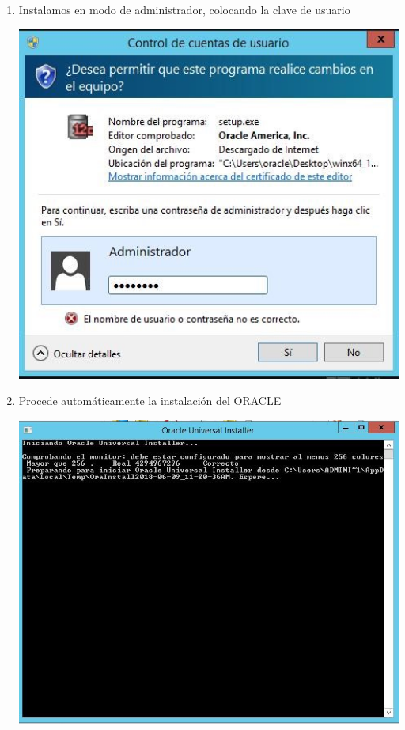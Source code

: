 \begin{enumerate}[1.]
	\item Instalamos en modo de administrador, colocando la clave de usuario\\
	\begin{center}
	\includegraphics[width=15cm]{./Imagenes/img10} 
	\end{center}

	\item Procede autom\'aticamente la instalaci\'on del ORACLE\\
	\begin{center}
	\includegraphics[width=15cm]{./Imagenes/img11} 
	\end{center}


\end{enumerate}
